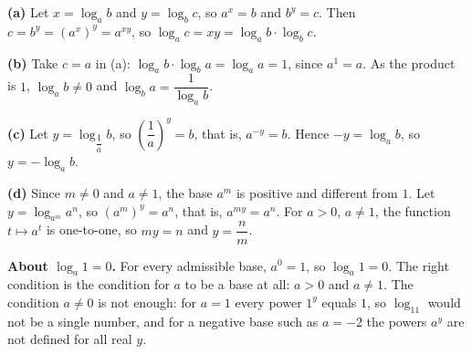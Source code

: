 \textbf{(a)} Let $x=\log_ab$ and $y=\log_bc$, so $a^x=b$ and $b^y=c$. Then $c=b^y=\left(a^x\right)^y=a^{xy}$, so $\log_ac=xy=\log_ab\cdot\log_bc$.

\textbf{(b)} Take $c=a$ in (a): $\log_ab\cdot\log_ba=\log_aa=1$, since $a^1=a$. As the product is $1$, $\log_ab\ne0$ and $\log_ba=\dfrac1{\log_ab}$.

\textbf{(c)} Let $y=\log_{\dfrac1a}b$, so $\left(\dfrac1a\right)^y=b$, that is, $a^{-y}=b$. Hence $-y=\log_ab$, so $y=-\log_ab$.

\textbf{(d)} Since $m\ne0$ and $a\ne1$, the base $a^m$ is positive and different from $1$. Let $y=\log_{a^m}a^n$, so $\left(a^m\right)^y=a^n$, that is, $a^{my}=a^n$. For $a>0$, $a\ne1$, the function $t\mapsto a^t$ is one-to-one, so $my=n$ and $y=\dfrac nm$.

\textbf{About $\log_a1=0$.} For every admissible base, $a^0=1$, so $\log_a1=0$. The right condition is the condition for $a$ to be a base at all: $a>0$ and $a\ne1$. The condition $a\ne0$ is not enough: for $a=1$ every power $1^y$ equals $1$, so $\log_11$ would not be a single number, and for a negative base such as $a=-2$ the powers $a^y$ are not defined for all real $y$.
